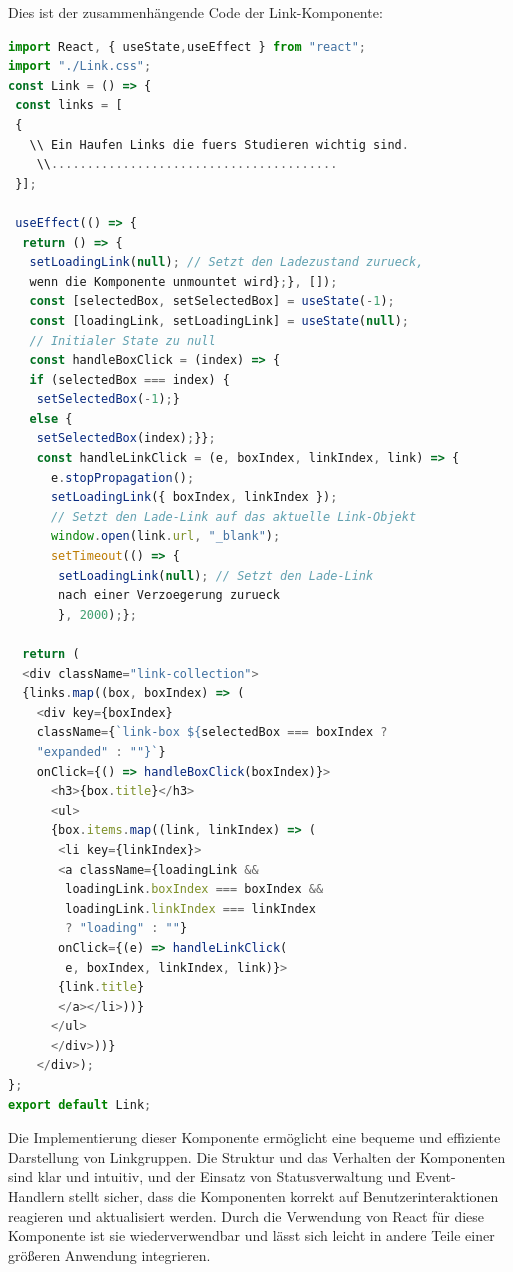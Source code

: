 Dies ist der zusammenhängende Code der Link-Komponente:
\begin{lstlisting}[language=JavaScript,
	frame=single,           % Ein Rahmen um den Code
	framexleftmargin=15pt,  % Rahmen link von den Zahlen
	style=algoBericht,
	label={Links-Komponente},
	captionpos=b ,          % Caption unter den Code setzen
	caption={Links-Komponente}]
import React, { useState,useEffect } from "react";
import "./Link.css";
const Link = () => {
 const links = [
 {
   \\ Ein Haufen Links die fuers Studieren wichtig sind.
    \\........................................
 }];

 useEffect(() => {
  return () => {
   setLoadingLink(null); // Setzt den Ladezustand zurueck, 
   wenn die Komponente unmountet wird};}, []);
   const [selectedBox, setSelectedBox] = useState(-1);
   const [loadingLink, setLoadingLink] = useState(null); 
   // Initialer State zu null
   const handleBoxClick = (index) => {
   if (selectedBox === index) {
   	setSelectedBox(-1);} 
   else {
   	setSelectedBox(index);}};
	const handleLinkClick = (e, boxIndex, linkIndex, link) => {
	  e.stopPropagation();
	  setLoadingLink({ boxIndex, linkIndex }); 
	  // Setzt den Lade-Link auf das aktuelle Link-Objekt
	  window.open(link.url, "_blank");
	  setTimeout(() => {
	   setLoadingLink(null); // Setzt den Lade-Link 
	   nach einer Verzoegerung zurueck
       }, 2000);};
   
  return (
  <div className="link-collection">
  {links.map((box, boxIndex) => (
  	<div key={boxIndex}
  	className={`link-box ${selectedBox === boxIndex ? 
  	"expanded" : ""}`}
    onClick={() => handleBoxClick(boxIndex)}>
      <h3>{box.title}</h3>
      <ul>
      {box.items.map((link, linkIndex) => (
       <li key={linkIndex}>
       <a className={loadingLink && 
       	loadingLink.boxIndex === boxIndex && 
       	loadingLink.linkIndex === linkIndex 
       	? "loading" : ""}
       onClick={(e) => handleLinkClick(
       	e, boxIndex, linkIndex, link)}>
       {link.title}
       </a></li>))}
      </ul>
      </div>))}
	</div>);
};
export default Link;

\end{lstlisting}

Die Implementierung dieser Komponente ermöglicht eine bequeme und effiziente Darstellung von Linkgruppen. Die Struktur und das Verhalten der Komponenten sind klar und intuitiv, und der Einsatz von Statusverwaltung und Event-Handlern stellt sicher, dass die Komponenten korrekt auf Benutzerinteraktionen reagieren und  aktualisiert werden. Durch die Verwendung von React für diese Komponente ist sie wiederverwendbar und lässt sich leicht in andere Teile einer größeren Anwendung integrieren.
\newpage
